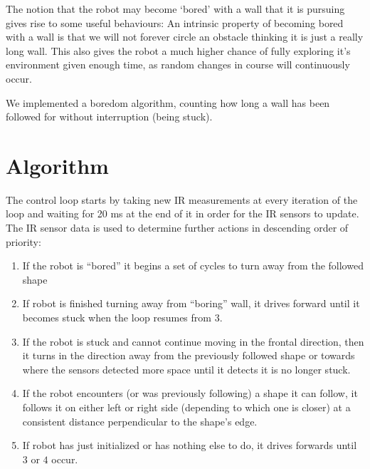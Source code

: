 \documentclass[11pt, a4paper]{article}
\begin{document}
The notion that the robot may become `bored' with a wall that it is pursuing gives 
rise to some useful behaviours: An intrinsic property of becoming bored with a wall 
is that we will not forever circle an obstacle thinking it is just a really long wall. 
This also gives the robot a much higher chance of fully exploring it's environment 
given enough time, as random changes in course will continuously occur.

We implemented a boredom algorithm, counting how long a wall has been followed for without interruption (being stuck).

\section{Algorithm}

The control loop starts by taking new IR measurements at every iteration 
of the loop and waiting for 20 ms at the end of it in order for the IR sensors to update. 
The IR sensor data is used to determine further actions in descending order of priority:

\begin{enumerate}
  \item If the robot is ``bored'' it begins a set of cycles to turn away from the followed shape 

  \item If robot is finished turning away from ``boring'' wall, it drives forward until it becomes stuck when the loop resumes from ${3.}$

  \item If the robot is stuck and cannot continue moving in the frontal direction, then it turns in the direction away from the previously followed shape or towards where the sensors detected more space until it detects it is no longer stuck. 

  \item If the robot encounters (or was previously following) a shape it can follow, it follows it on either left or right side (depending to which one is closer) at a consistent distance perpendicular to the shape's edge.
  
  \item If robot has just initialized or has nothing else to do, it drives forwards until $3$ or $4$ occur. 
\end{enumerate}
\end{document}
